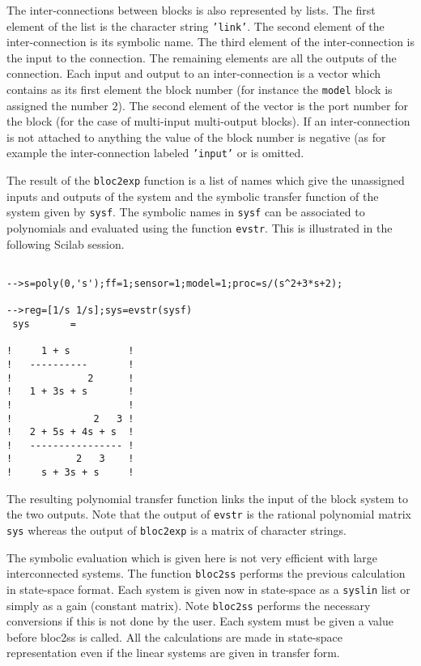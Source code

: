 	The inter-connections between blocks is also represented by lists.  
The first element of the list is the character string {\tt 'link'}.
The second element of the inter-connection is its symbolic name.
The third element of the inter-connection is the input to the connection.
The remaining elements are all the outputs of the connection.
Each input and output to an inter-connection is a vector which
contains as its first element the block number (for instance the {\tt model}
block is assigned the number $2$).  The second element of the vector
is the port number for the block (for the case of multi-input multi-output
blocks).  If an inter-connection is not attached to anything the value
of the block number is negative (as for example the inter-connection
labeled {\tt 'input'} or is omitted.

	The result of the {\tt bloc2exp} function is a list of names
which give the unassigned inputs and outputs of the system and
the symbolic transfer function of the system given by {\tt sysf}.
The symbolic names in {\tt sysf} can be associated to polynomials
and evaluated using the function {\tt evstr}.  This is illustrated in the
following Scilab session.
%
\begin{verbatim}
 
-->s=poly(0,'s');ff=1;sensor=1;model=1;proc=s/(s^2+3*s+2);
 
-->reg=[1/s 1/s];sys=evstr(sysf)
 sys       =
 
!     1 + s          !
!   ----------       !
!             2      !
!   1 + 3s + s       !
!                    !
!              2   3 !
!   2 + 5s + 4s + s  !
!   ---------------- !
!           2   3    !
!     s + 3s + s     !

\end{verbatim}
%
The resulting polynomial transfer function links the input
of the block system to the two outputs.  Note that the output
of {\tt evstr} is the rational polynomial matrix {\tt sys}
whereas the output of {\tt bloc2exp} is a matrix of character strings.

The symbolic evaluation which is given here is not very efficient
with large interconnected systems. The function {\tt bloc2ss}
performs the previous calculation in state-space format.
Each system is given now in state-space 
as a {\tt syslin} list or simply as a gain (constant matrix). 
Note {\tt bloc2ss} performs the necessary conversions if this 
is not done by the user. Each system must be given a value before
bloc2ss is called. All the calculations are made in state-space
representation even if the linear systems are given in transfer form.

